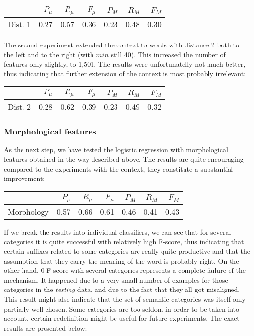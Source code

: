 \documentclass[letterpaper]{article}
\begin{document}
\begin{table}[h]

\begin{tabular}{|r|r|r|r|r|r|r|}
 \hline
 & $P_\mu$ & $R_\mu$ & $F_\mu$ & $P_M$ & $R_M$  & $F_M$ \\ \hline
Dist. 1 & 0.27 & 0.57 & 0.36 & 0.23 & 0.48 & 0.30 \\ \hline
\end{tabular}
\end{table}

The second experiment extended the context to words with distance 2 both to the left and to the right (with $min$ still 40). This increased the number of features only slightly, to 1,501. The results were unfortunatelly not much better, thus indicating that further extension of the context is most probably irrelevant:

\begin{table}[h]
\begin{tabular}{|r|r|r|r|r|r|r|}
 \hline
 & $P_\mu$ & $R_\mu$ & $F_\mu$ & $P_M$ & $R_M$  & $F_M$ \\ \hline
Dist. 2 & 0.28 & 0.62 & 0.39 & 0.23 & 0.49 & 0.32 \\ \hline
\end{tabular}
\end{table}



\subsubsection{Morphological features}
As the next step, we have tested the logistic regression with morphological features obtained in the way described above. The results are quite encouraging compared to the experiments with the context, they constitute a substantial improvement:

\begin{table}[h]
\begin{tabular}{|r|r|r|r|r|r|r|}
 \hline
 & $P_\mu$ & $R_\mu$ & $F_\mu$ & $P_M$ & $R_M$  & $F_M$ \\ \hline
Morphology & 0.57 & 0.66 & 0.61 & 0.46 & 0.41 & 0.43 \\ \hline
\end{tabular}

\end{table}

If we break the results into individual classifiers, we can see that for several categories it is quite successful with relatively high F-score, thus indicating that certain suffixes related to some categories are really quite productive and that the assumption that they carry the meaning of the word is probably right. On the other hand, 0 F-score with several categories represents a complete failure of the mechanism. It happened due to a very small number of examples for those categories in the \emph{testing} data, and due to the fact that they all got misaligned. This result might also indicate that the set of semantic categories was itself only partially well-chosen. Some categories are too seldom in order to be taken into account, certain redefinition might be useful for future experiments. The exact results are presented below: 
\end{document}
